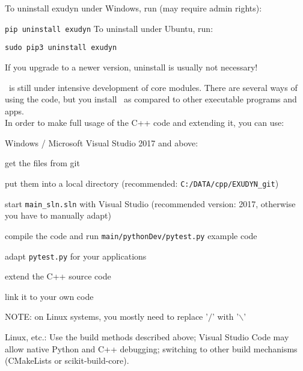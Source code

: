 
To uninstall exudyn under Windows, run (may require admin rights):
\bi
  \item[] \texttt{pip uninstall exudyn}
\ei
\noindent To uninstall under Ubuntu, run:
\bi
  \item[] \texttt{sudo pip3 uninstall exudyn}
\ei

If you upgrade to a newer version, uninstall is usually not necessary!
%

\codeName\ is still under intensive development of core modules.
There are several ways of using the code, but you  install \codeName\ as compared to other executable programs and apps.
\vspace{6pt}\\
In order to make full usage of the C++ code and extending it, you can use:
\bi
  \item Windows / Microsoft Visual Studio 2017 and above:
  \bi
    \item get the files from git
    \item put them into a local directory (recommended: \texttt{C:/DATA/cpp/EXUDYN\_git})
    \item start \texttt{main\_sln.sln} with Visual Studio (recommended version: 2017, otherwise you have to manually adapt)
    \item compile the code and run \texttt{main/pythonDev/pytest.py} example code
    \item adapt \texttt{pytest.py} for your applications
    \item extend the C++ source code
    \item link it to your own code
    \item NOTE: on Linux systems, you mostly need to replace '$/$' with '$\backslash$'
  \ei
  \item Linux, etc.: Use the build methods described above; Visual Studio Code may allow native Python and C++ debugging; switching to other build mechanisms (CMakeLists or scikit-build-core).
\ei
%
